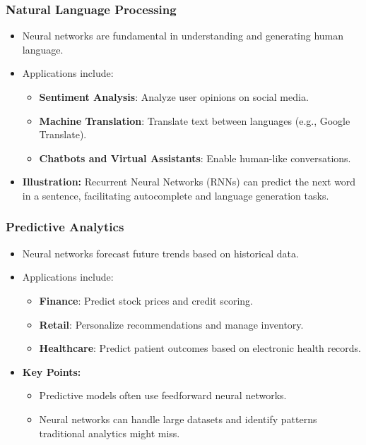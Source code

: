 \documentclass[aspectratio=169]{beamer}
\begin{document}
\begin{frame}[fragile]
    \frametitle{Natural Language Processing}
    \begin{itemize}
        \item Neural networks are fundamental in understanding and generating human language.
        \item Applications include:
        \begin{itemize}
            \item \textbf{Sentiment Analysis}: Analyze user opinions on social media.
            \item \textbf{Machine Translation}: Translate text between languages (e.g., Google Translate).
            \item \textbf{Chatbots and Virtual Assistants}: Enable human-like conversations.
        \end{itemize}
        \item \textbf{Illustration:} Recurrent Neural Networks (RNNs) can predict the next word in a sentence, facilitating autocomplete and language generation tasks.
    \end{itemize}
\end{frame}

\begin{frame}[fragile]
    \frametitle{Predictive Analytics}
    \begin{itemize}
        \item Neural networks forecast future trends based on historical data.
        \item Applications include:
        \begin{itemize}
            \item \textbf{Finance}: Predict stock prices and credit scoring.
            \item \textbf{Retail}: Personalize recommendations and manage inventory.
            \item \textbf{Healthcare}: Predict patient outcomes based on electronic health records.
        \end{itemize}
        \item \textbf{Key Points:} 
        \begin{itemize}
            \item Predictive models often use feedforward neural networks.
            \item Neural networks can handle large datasets and identify patterns traditional analytics might miss.
        \end{itemize}
    \end{itemize}
\end{frame}
\end{document}
